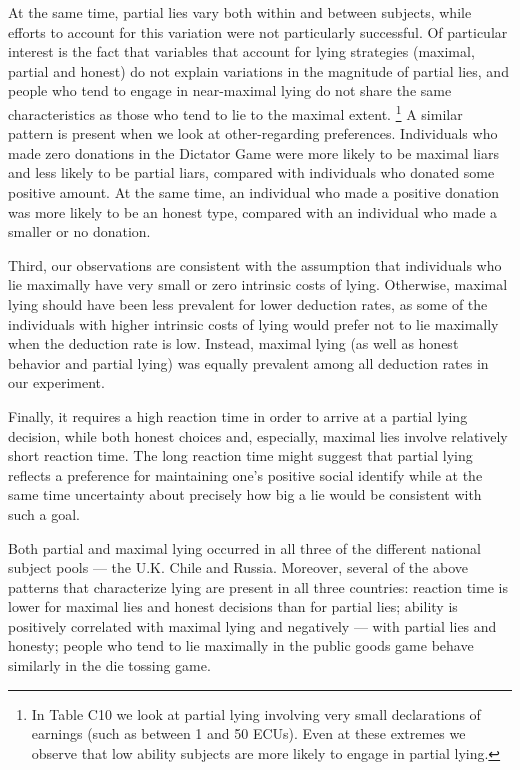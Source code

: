 \documentclass[12pt]{article}
\begin{document}
\par At the same time, partial lies vary both within and between subjects, while efforts to account for this variation were not particularly successful.  Of particular interest is the fact that variables that account for lying strategies (maximal, partial and honest) do not explain variations in the magnitude of partial lies, and people who tend to engage in near-maximal lying do not share the same characteristics as those who tend to lie to the maximal extent. \footnote{In Table C10 we look at partial lying involving very small declarations of earnings (such as between 1 and 50 ECUs).  Even at these extremes we observe that low ability subjects are more likely to engage in partial lying.} A similar pattern is present when we look at other-regarding preferences. Individuals who made zero donations in the Dictator Game were more likely to be maximal liars and less likely to be partial liars, compared with individuals who donated some positive amount. At the same time, an individual who made a positive donation was more likely to be an honest type, compared with an individual who made a smaller or no donation. 

\par Third, our observations are consistent with the assumption that individuals who lie maximally have very small or zero intrinsic costs of lying. Otherwise, maximal lying should have been less prevalent for lower deduction rates, as some of the individuals with higher intrinsic costs of lying would prefer not to lie maximally when the deduction rate is low. Instead, maximal lying (as well as honest behavior and partial lying) was equally prevalent among all deduction rates in our experiment. 
 
\par Finally, it requires a high reaction time in order to arrive at a partial lying decision, while both honest choices and, especially, maximal lies involve relatively short reaction time. The long reaction time might suggest that partial lying reflects a preference for maintaining one’s positive social identify while at the same time uncertainty about precisely how big a lie would be consistent with such a goal.

\par Both partial and maximal lying occurred in all three of the different national subject pools --- the U.K. Chile and Russia. Moreover, several of the above patterns that characterize lying are present in all three countries: reaction time is lower for maximal lies and honest decisions than for partial lies; ability is positively correlated with maximal lying and negatively --- with partial lies and honesty; people who tend to lie maximally in the public goods game behave similarly in the die tossing game. 
\end{document}
